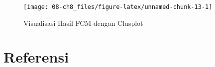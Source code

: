 \documentclass[
  oneside]{book}
\begin{document}
\begin{figure}[h]

{\centering \texttt{[image: 08-ch8\_files/figure-latex/unnamed-chunk-13-1]} 

}

\caption{Visualisasi Hasil FCM dengan Clusplot}\label{fig:unnamed-chunk-13}
\end{figure}

\chapter*{Referensi}\label{References}

  
\end{document}
